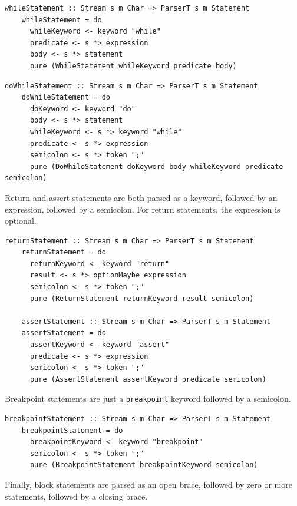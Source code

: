 \documentclass[UdineBachThesis,american,11pt]{PhdThesis}
\begin{document}
  \begin{Verbatim}[gobble=4,fontsize=\small]
    whileStatement :: Stream s m Char => ParserT s m Statement
    whileStatement = do
      whileKeyword <- keyword "while"
      predicate <- s *> expression
      body <- s *> statement
      pure (WhileStatement whileKeyword predicate body)
  \end{Verbatim}

  \pagebreak

  \begin{Verbatim}[gobble=4,fontsize=\small]
    doWhileStatement :: Stream s m Char => ParserT s m Statement
    doWhileStatement = do
      doKeyword <- keyword "do"
      body <- s *> statement
      whileKeyword <- s *> keyword "while"
      predicate <- s *> expression
      semicolon <- s *> token ";"
      pure (DoWhileStatement doKeyword body whileKeyword predicate semicolon)
  \end{Verbatim}

  Return and assert statements are both parsed as a keyword, followed by an
  expression, followed by a semicolon. For return statements, the expression is
  optional.

  \begin{Verbatim}[gobble=4,fontsize=\small]
    returnStatement :: Stream s m Char => ParserT s m Statement
    returnStatement = do
      returnKeyword <- keyword "return"
      result <- s *> optionMaybe expression
      semicolon <- s *> token ";"
      pure (ReturnStatement returnKeyword result semicolon)

    assertStatement :: Stream s m Char => ParserT s m Statement
    assertStatement = do
      assertKeyword <- keyword "assert"
      predicate <- s *> expression
      semicolon <- s *> token ";"
      pure (AssertStatement assertKeyword predicate semicolon)
  \end{Verbatim}

  Breakpoint statements are just a \mbox{\texttt{breakpoint}} keyword followed
  by a semicolon.

  \begin{Verbatim}[gobble=4,fontsize=\small]
    breakpointStatement :: Stream s m Char => ParserT s m Statement
    breakpointStatement = do
      breakpointKeyword <- keyword "breakpoint"
      semicolon <- s *> token ";"
      pure (BreakpointStatement breakpointKeyword semicolon)
  \end{Verbatim}

  Finally, block statements are parsed as an open brace, followed by zero or
  more statements, followed by a closing brace.
\end{document}
